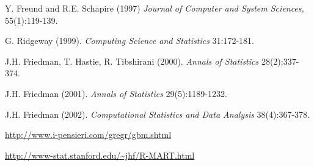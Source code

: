 \documentclass{article}
\begin{document}
\begin{References}\relax
Y. Freund and R.E. Schapire (1997)  \emph{Journal of Computer and
System Sciences,} 55(1):119-139.

G. Ridgeway (1999).  \emph{Computing Science and
Statistics} 31:172-181.

J.H. Friedman, T. Hastie, R. Tibshirani (2000).  \emph{Annals of Statistics} 28(2):337-374.

J.H. Friedman (2001).  \emph{Annals of Statistics} 29(5):1189-1232.

J.H. Friedman (2002).  \emph{Computational Statistics
and Data Analysis} 38(4):367-378.

\url{http://www.i-pensieri.com/gregr/gbm.shtml}

\url{http://www-stat.stanford.edu/~jhf/R-MART.html}
\end{References}
\end{document}
